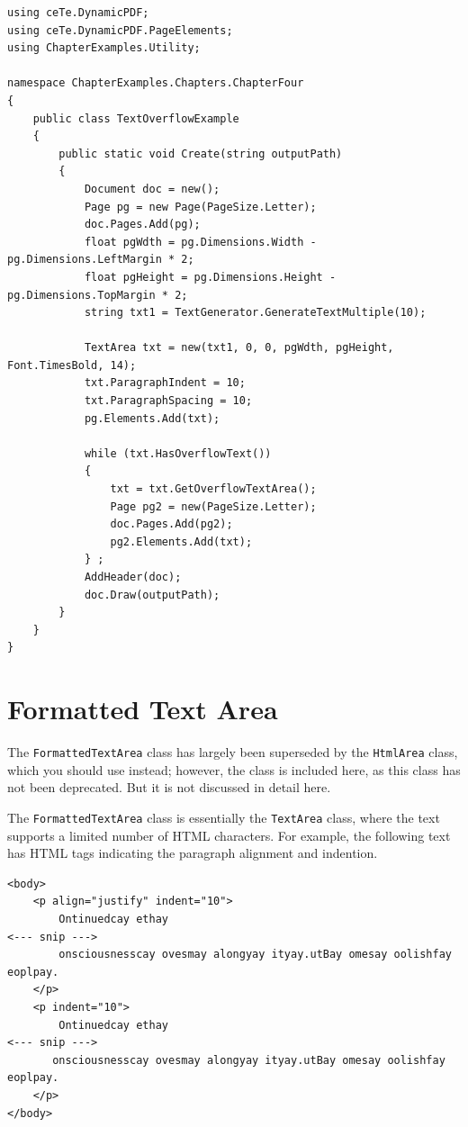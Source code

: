 \documentclass[american]{tufte-book}
\numberwithin{equation}{section}
\numberwithin{figure}{section}
\begin{document}
\bgroup{}
\begin{lstlisting}[caption={Handling text overflow.},label={lis:Handling-text-overflow},basicstyle={\footnotesize\ttfamily},breaklines=true]
using ceTe.DynamicPDF;
using ceTe.DynamicPDF.PageElements;
using ChapterExamples.Utility;

namespace ChapterExamples.Chapters.ChapterFour
{
    public class TextOverflowExample
    {
        public static void Create(string outputPath)
        {
            Document doc = new();
            Page pg = new Page(PageSize.Letter);
            doc.Pages.Add(pg);
            float pgWdth = pg.Dimensions.Width - pg.Dimensions.LeftMargin * 2;
            float pgHeight = pg.Dimensions.Height - pg.Dimensions.TopMargin * 2;
            string txt1 = TextGenerator.GenerateTextMultiple(10);

            TextArea txt = new(txt1, 0, 0, pgWdth, pgHeight, Font.TimesBold, 14);
            txt.ParagraphIndent = 10;
            txt.ParagraphSpacing = 10;
            pg.Elements.Add(txt);

            while (txt.HasOverflowText())
            {
                txt = txt.GetOverflowTextArea();
                Page pg2 = new(PageSize.Letter);
                doc.Pages.Add(pg2);
                pg2.Elements.Add(txt);
            } ;
            AddHeader(doc);
            doc.Draw(outputPath);
        }
    } 
}
\end{lstlisting}
\leavevmode\egroup


\section{Formatted Text Area}

The \texttt{FormattedTextArea} class has largely been superseded by
the \texttt{HtmlArea} class, which you should use instead; however,
the class is included here, as this class has not been deprecated.
But it is not discussed in detail here.

The \texttt{FormattedTextArea} class is essentially the \texttt{TextArea}
class, where the text supports a limited number of HTML characters.
For example, the following text has HTML tags indicating the paragraph
alignment and indention.

\bgroup{}
\begin{lstlisting}[basicstyle={\footnotesize\ttfamily},breaklines=true]
<body>
    <p align="justify" indent="10">
        Ontinuedcay ethay
<--- snip --->
        onsciousnesscay ovesmay alongyay ityay.utBay omesay oolishfay eoplpay.
    </p>
    <p indent="10">
        Ontinuedcay ethay
<--- snip --->
       onsciousnesscay ovesmay alongyay ityay.utBay omesay oolishfay eoplpay.
    </p>
</body>
\end{lstlisting}
\leavevmode\egroup
\end{document}
